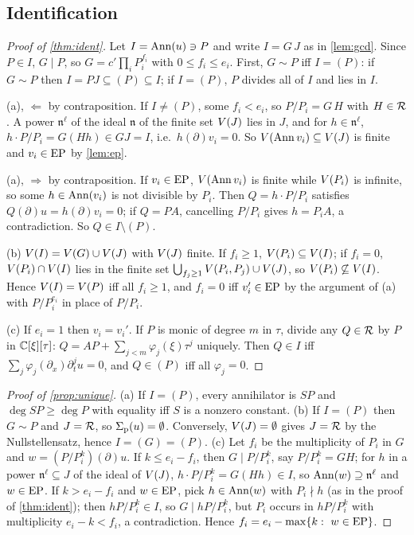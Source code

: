 \subsection{Identification}
\begin{proof}[Proof of \cref{thm:ident}]
Let $I=\operatorname{Ann}(u)\ni P$ and write $I=G\,J$ as in \cref{lem:gcd}. Since $P\in I$, $G\mid P$, so
$G=c'\prod_iP_i^{f_i}$ with $0\le f_i\le e_i$. First, $G\sim P$ iff $I=(P)$: if $G\sim P$ then
$I=PJ\subseteq(P)\subseteq I$; if $I=(P)$, $P$ divides all of $I$ and lies in $I$.

(a), $\Leftarrow$ by contraposition. If $I\ne(P)$, some $f_i<e_i$, so $P/P_i=G\,H$ with $H\in\mathcal{R}$. A power
$\mathfrak n^{\ell}$ of the ideal $\mathfrak n$ of the finite set $V(J)$ lies in $J$, and for $h\in\mathfrak n^{\ell}$,
$h\cdot P/P_i=G(Hh)\in GJ=I$, i.e.\ $h(\partial)v_i=0$. So $V(\operatorname{Ann} v_i)\subseteq V(J)$ is finite and
$v_i\in\mathrm{EP}$ by \cref{lem:ep}.

(a), $\Rightarrow$ by contraposition. If $v_i\in\mathrm{EP}$, $V(\operatorname{Ann} v_i)$ is finite while $V(P_i)$ is infinite, so
some $h\in\operatorname{Ann}(v_i)$ is not divisible by $P_i$. Then $Q=h\cdot P/P_i$ satisfies $Q(\partial)u=h(\partial)v_i=0$; if
$Q=PA$, cancelling $P/P_i$ gives $h=P_iA$, a contradiction. So $Q\in I\setminus(P)$.

(b) $V(I)=V(G)\cup V(J)$ with $V(J)$ finite. If $f_i\ge1$, $V(P_i)\subseteq V(I)$; if $f_i=0$,
$V(P_i)\cap V(I)$ lies in the finite set $\bigcup_{f_j\ge1}V(P_i,P_j)\cup V(J)$, so
$V(P_i)\not\subseteq V(I)$. Hence $V(I)=V(P)$ iff all $f_i\ge1$, and $f_i=0$ iff $v_i'\in\mathrm{EP}$ by the
argument of (a) with $P/P_i^{e_i}$ in place of $P/P_i$.

(c) If $e_i=1$ then $v_i=v_i'$. If $P$ is monic of degree $m$ in $\tau$, divide any $Q\in\mathcal{R}$ by $P$ in
$\mathbb{C}[\xi][\tau]$: $Q=AP+\sum_{j<m}\varphi_j(\xi)\tau^j$ uniquely. Then $Q\in I$ iff $\sum_j\varphi_j(\partial_x)\partial_t^ju=0$, and
$Q\in(P)$ iff all $\varphi_j=0$.
\end{proof}

\begin{proof}[Proof of \cref{prop:unique}]
(a) If $I=(P)$, every annihilator is $SP$ and $\deg SP\ge\deg P$ with equality iff $S$ is a nonzero constant.
(b) If $I=(P)$ then $G\sim P$ and $J=\mathcal{R}$, so $\Sigma_{\mathrm p}(u)=\emptyset$. Conversely, $V(J)=\emptyset$ gives $J=\mathcal{R}$ by
the Nullstellensatz, hence $I=(G)=(P)$. (c) Let $f_i$ be the multiplicity of $P_i$ in $G$ and $w=(P/P_i^k)(\partial)u$. If $k\le e_i-f_i$, then
$G\mid P/P_i^k$, say $P/P_i^k=GH$; for $h$ in a power $\mathfrak n^{\ell}\subseteq J$ of the ideal of $V(J)$,
$h\cdot P/P_i^k=G(Hh)\in I$, so $\operatorname{Ann}(w)\supseteq\mathfrak n^{\ell}$ and $w\in\mathrm{EP}$. If $k>e_i-f_i$ and $w\in\mathrm{EP}$, pick
$h\in\operatorname{Ann}(w)$ with $P_i\nmid h$ (as in the proof of \cref{thm:ident}); then $hP/P_i^k\in I$, so $G\mid hP/P_i^k$, but
$P_i$ occurs in $hP/P_i^k$ with multiplicity $e_i-k<f_i$, a contradiction. Hence
$f_i=e_i-\max\{k:\ w\in\EP\}$.
\end{proof}

